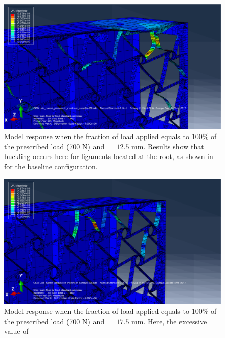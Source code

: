       \begin{figure}[!htpb] %
        \centering
        \includegraphics[width=0.8 \textwidth]{../figures/result-sim/r/12coma5-UR}
        \caption[Model response when the fraction of load applied equals to 100\% of the prescribed load (700 N) and \chir$ = 12.5$ mm]{Model response when the fraction of load applied equals to 100\% of the prescribed load (700 N) and \chir$ = 12.5$ mm. Results show that buckling occurs here for ligaments located at the root, as shown in for the baseline configuration.}\label{fig:r12coma5-UR}
      \end{figure}

      \begin{figure}[!htpb] %
        \centering
        \includegraphics[width=0.8 \textwidth]{../figures/result-sim/r/17coma5-UR}
        \caption[Model response when the fraction of load applied equals to 100\% of the prescribed load (700 N) and \chir$ = 17.5$ mm]{Model response when the fraction of load applied equals to 100\% of the prescribed load (700 N) and \chir$ = 17.5$ mm. Here, the excessive value of }\label{fig:r17coma5-UR}
      \end{figure}

